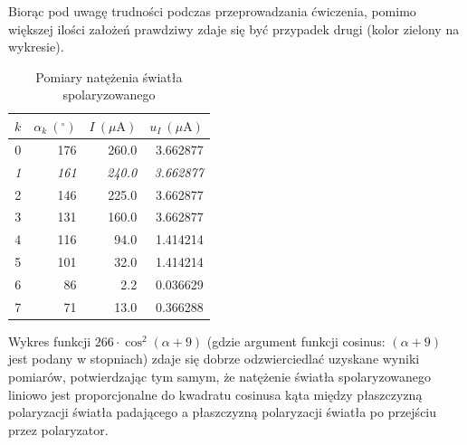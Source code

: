 \documentclass[a4paper]{article}
\begin{document}
Biorąc pod uwagę trudności podczas przeprowadzania ćwiczenia, pomimo większej ilości założeń prawdziwy zdaje się być przypadek drugi (kolor zielony na wykresie).


\begin{table}[h]
\centering
\begin{tabular}{rrrr}
\toprule
 $k$ &  $\alpha_k \ ({}^\circ)$ &  $I \ (\mu\text{A})$ &  $u_I \ (\mu \text{A})$ \\
\midrule
 0 &       176 &   260.0 &         3.662877 \\
 \textit{1} & 	   \textit{161} &   \textit{240.0} &         \textit{3.662877} \\
 2 &       146 &   225.0 &         3.662877 \\
 3 &       131 &   160.0 &         3.662877 \\
 4 &       116 &    94.0 &         1.414214 \\
 5 &       101 &    32.0 &         1.414214 \\
 6 &        86 &     2.2 &         0.036629 \\
 7 &        71 &    13.0 &         0.366288 \\
\bottomrule
\end{tabular}
\caption{Pomiary natężenia światła spolaryzowanego}
\label{malus-pomiary}
\end{table}

Wykres funkcji $266 \cdot \cos^2(\alpha + 9)$ (gdzie argument funkcji cosinus: $(\alpha + 9)$ jest podany w stopniach) zdaje się dobrze odzwierciedlać uzyskane wyniki pomiarów, potwierdzając tym samym, że natężenie światła spolaryzowanego liniowo jest proporcjonalne do kwadratu cosinusa kąta między płaszczyzną polaryzacji światła padającego a płaszczyzną polaryzacji światła po przejściu przez polaryzator.
\end{document}
